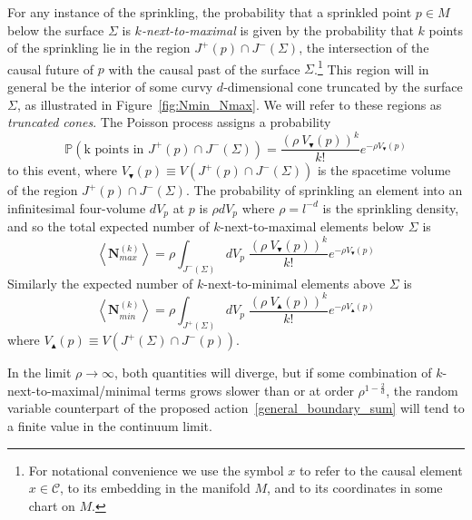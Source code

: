 \documentclass[12pt]{article}
\newcommand{\be}{\begin{equation}}
\newcommand{\ee}{\end{equation}}
\begin{document}
For any instance of the sprinkling, the probability that a sprinkled point $p\in M$ below the surface $\Sigma$ is $k$\emph{-next-to-maximal} is given by the probability that $k$ points of the sprinkling lie in the region $J^{+} (p)\cap J^{-} (\Sigma)$, the intersection of the causal future of $p$ with the causal past of the surface $\Sigma$.\footnote{For notational convenience we use the symbol $x$ to refer to the causal element $x\in\mathcal C$, to its embedding in the manifold $M$, and to its coordinates in some chart on $M$.} This region will in general be the interior of some curvy $d$-dimensional cone truncated by the surface $\Sigma$, as illustrated in Figure~\ref{fig:Nmin_Nmax}. We will refer to these regions as \emph{truncated cones}. The Poisson process assigns a probability
\be\label{Poisson}
\mathbb P\left (\text{k points in }J^{+} (p)\cap J^{-} (\Sigma)\right)=\frac{\left (\rho\: V_\blacktriangledown (p)\right)^k}{k!}e^{-\rho V_\blacktriangledown (p)}
\ee
to this event, where $V_\blacktriangledown (p)\equiv V (J^{+} (p)\cap J^{-} (\Sigma))$ is the spacetime volume of the region $J^{+} (p)\cap J^{-} (\Sigma)$. The probability of sprinkling an element into an infinitesimal four-volume $dV_p$ at $p$ is $\rho dV_p$ where $\rho=l^{-d}$ is the sprinkling density, and so the total expected number of $k$-next-to-maximal elements below $\Sigma$ is
\be\label{eq:nmax}
\left\langle \textbf{N}_{max}^{ (k)}\right\rangle =\rho\int_{J^{-} (\Sigma)}dV_p\; \frac{\left (\rho\: V_\blacktriangledown (p)\right)^k}{k!}e^{-\rho V_\blacktriangledown (p)}
\ee
Similarly the expected number of $k$-next-to-minimal elements above $\Sigma$ is
\be\label{eq:nmin}
\left\langle \textbf{N}_{min}^{ (k)}\right\rangle =\rho\int_{J^{+} (\Sigma)}dV_p\; \frac{\left (\rho\: V_\blacktriangle (p)\right)^k}{k!}e^{-\rho V_\blacktriangle (p)}
\ee
where $V_\blacktriangle (p)\equiv V (J^{+} (\Sigma)\cap J^{-} (p))$.

In the limit $\rho\rightarrow\infty$, both quantities will diverge, but if some combination of $k$-next-to-maximal/minimal terms grows slower than or at order $\rho^{1-\frac2d}$, the random variable counterpart of the proposed action~\eqref{general_boundary_sum} will tend to a finite value in the continuum limit.
\end{document}
